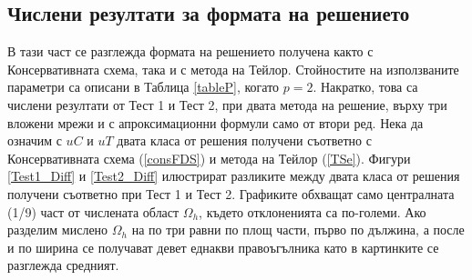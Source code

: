 \documentclass{article}
\newcommand{\rf}[1]{(\ref{#1})}
\begin{document}
\subsection{Числени резултати за формата на решението}
В тази част се разглежда формата на решението получена както с Консервативната схема, така и с метода на Тейлор. Стойностите на използваните параметри са описани в Таблица \ref{tableP}, когато $p=2$. Накратко, това са числени резултати от Тест 1 и Тест 2, при двата метода на решение, върху три вложени мрежи и с апроксимационни формули само от втори ред. Нека да означим с $uC$ и $uT$ двата класа от решения получени съответно с Консервативната схема \rf{consFDS} и метода на Тейлор \rf{TSe}. 
Фигури \ref{Test1_Diff} и \ref{Test2_Diff} илюстрират разликите между двата класа от решения получени съответно при Тест 1 и Тест 2. Графиките обхващат само централната (1/9) част от числената област $\Omega_h$, където отклоненията са по-големи. Ако разделим мислено $\Omega_h$ на по три равни по площ части, първо по дължина, а после и по ширина се получават девет еднакви правоъгълника като в картинките се разглежда средният.
\end{document}
